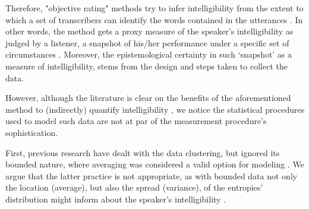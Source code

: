 \begin{comment}
	
	As the literature suggests, objective rating procedures produce more valid\footnote{validity is understood as the extent to which scores are appropriate for their intended interpretation and use \citep{Lesterhuis_2018, Trochim_2022}.} and reliable\footnote{reliability is though as the extend to which a measure would give us the same result over and over again \citep{Trochim_2022}, i.e. measure something, free from error, in a consistent way.} scores than any other available procedure \citep{Boonen_et_al_2021, Faes_et_al_2021}, as the method does not hinge in the use or production of a \textit{subjective rating scale}, i.e. a scale based on a personal perception of the child's intelligibility. Moreover, the previous advantages are further emphasized by the use of stimuli gathered from spontaneous speech tasks, as they have a greater level of ecological validity, especially compared to contextualized utterances or reading at loud tasks \citep{Flipsen_2006, Ertmer_2011}.
	
\end{comment}

Therefore, "objective rating" methods try to infer intelligibility from the extent to which a set of transcribers can identify the words contained in the utterances \citep{Boonen_et_al_2021}. In other words, the method gets a proxy measure of the speaker's intelligibility as judged by a listener, a snapshot of his/her performance under a specific set of circumstances \citep{Hustad_et_al_2020}. Moreover, the epistemological certainty in such ‘snapshot’ as a measure of intelligibility, stems from the design and steps taken to collect the data.

However, although the literature is clear on the benefits of the aforementioned method to (indirectly) quantify intelligibility \citep{Boonen_et_al_2020, Boonen_et_al_2021, Hustad_et_al_2020}, we notice the statistical procedures used to model such data are not at par of the measurement procedure's sophistication.

First, previous research have dealt with the data clustering, but ignored its bounded nature, where averaging was considered a valid option for modeling \citep{Boonen_et_al_2021}. We argue that the latter practice is not appropriate, as with bounded data not only the location (average), but also the spread (variance), of the entropies' distribution might inform about the speaker's intelligibility \citep{Nelder_et_al_1983}.

